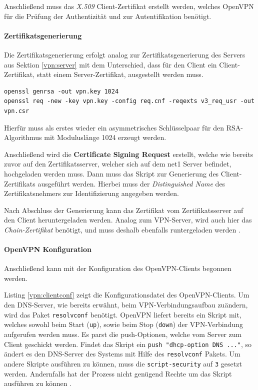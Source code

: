 Anschließend muss das \emph{X.509} Client-Zertifikat erstellt werden, welches OpenVPN für die Prüfung der Authentizität und zur Autentifikation benötigt.

\paragraph{Zertifikatsgenerierung}

Die Zertifikatsgenerierung erfolgt analog zur Zertifikatsgenerierung des Servers aus Sektion \ref{vpn:server} mit dem Unterschied, dass für den Client ein Client-Zertifikat, statt einem Server-Zertifikat, ausgestellt werden muss.


\begin{lstlisting}
openssl genrsa -out vpn.key 1024
openssl req -new -key vpn.key -config req.cnf -reqexts v3_req_usr -out vpn.csr
\end{lstlisting}

Hierfür muss als erstes wieder ein asymmetrisches Schlüsselpaar für den RSA-Algorithmus mit Moduluslänge 1024 erzeugt werden.

Anschließend wird die \textbf{Certificate Signing Request} erstellt, welche wie bereits zuvor auf den Zertifikatsserver, welcher sich auf dem net1 Server befindet, hochgeladen werden muss. Dann muss das Skript zur Generierung des Client-Zertifikats ausgeführt werden. Hierbei muss der \emph{Distinguished Name} des Zertifikatsnehmers zur Identifizierung angegeben werden.

Nach Abschluss der Generierung kann das Zertifikat vom Zertifikatsserver auf den Client heruntergeladen werden. Analog zum VPN-Server, wird auch hier das \emph{Chain-Zertifikat} benötigt, und muss deshalb ebenfalls runtergeladen werden  \cite{Neuschwander2014}.

\paragraph{OpenVPN Konfiguration}

Anschließend kann mit der Konfiguration des OpenVPN-Clients begonnen werden.



Listing \ref{vpn:clientconf} zeigt die Konfigurationsdatei des OpenVPN-Clients. Um den DNS-Server, wie bereits erwähnt, beim VPN-Verbindungsaufbau zuändern, wird das Paket \texttt{resolvconf} benötigt. OpenVPN liefert bereits ein Skript mit, welches sowohl beim Start (\texttt{up}), sowie beim Stop (\texttt{down}) der VPN-Verbindung aufgerufen werden muss. Es parst die push-Optionen, welche vom Server zum Client geschickt werden. Findet das Skript ein \texttt{push "dhcp-option DNS ..."}, so ändert es den DNS-Server des Systems mit Hilfe des \texttt{resolvconf} Pakets. Um andere Skripte ausführen zu können, muss die \texttt{script-security} auf \texttt{3} gesetzt werden. Andernfalls hat der Prozess nicht genügend Rechte um das Skript ausführen zu können \cite{OpenVPN}.

